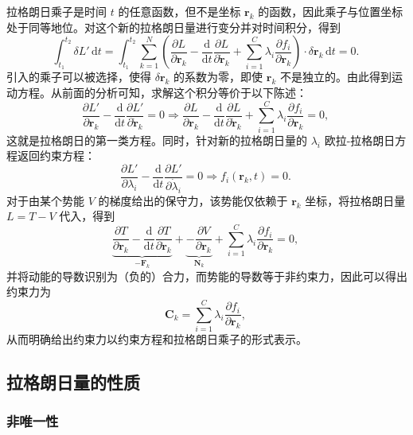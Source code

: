 拉格朗日乘子是时间 \( t \) 的任意函数，但不是坐标 \( \mathbf{r}_k \) 的函数，因此乘子与位置坐标处于同等地位。对这个新的拉格朗日量进行变分并对时间积分，得到
\[
\int_{t_{1}}^{t_{2}} \delta L' \, \mathrm{d} t = \int_{t_{1}}^{t_{2}} \sum_{k=1}^{N} \left( \frac{\partial L}{\partial \mathbf{r}_{k}} - \frac{\mathrm{d}}{\mathrm{d} t} \frac{\partial L}{\partial \dot{\mathbf{r}}_{k}} + \sum_{i=1}^{C} \lambda_{i} \frac{\partial f_{i}}{\partial \mathbf{r}_{k}} \right) \cdot \delta \mathbf{r}_{k} \, \mathrm{d} t = 0.~
\]
引入的乘子可以被选择，使得 \( \delta \mathbf{r}_k \) 的系数为零，即使 \( \mathbf{r}_k \) 不是独立的。由此得到运动方程。从前面的分析可知，求解这个积分等价于以下陈述：
\[
\frac{\partial L'}{\partial \mathbf{r}_{k}} - \frac{\mathrm{d}}{\mathrm{d} t} \frac{\partial L'}{\partial \dot{\mathbf{r}}_{k}} = 0 \Rightarrow \frac{\partial L}{\partial \mathbf{r}_{k}} - \frac{\mathrm{d}}{\mathrm{d} t} \frac{\partial L}{\partial \dot{\mathbf{r}}_{k}} + \sum_{i=1}^{C} \lambda_{i} \frac{\partial f_{i}}{\partial \mathbf{r}_{k}} = 0,~
\]
这就是拉格朗日的第一类方程。同时，针对新的拉格朗日量的 \( \lambda_i \) 欧拉-拉格朗日方程返回约束方程：
\[
\frac{\partial L'}{\partial \lambda_{i}} - \frac{\mathrm{d}}{\mathrm{d} t} \frac{\partial L'}{\partial \dot{\lambda}_{i}} = 0 \Rightarrow f_{i}(\mathbf{r}_{k}, t) = 0.~
\]
对于由某个势能 \( V \) 的梯度给出的保守力，该势能仅依赖于 \( \mathbf{r}_k \) 坐标，将拉格朗日量 \( L = T - V \) 代入，得到
\[
\underbrace{{\frac {\partial T}{\partial \mathbf{r}_{k}}}-{\frac {\mathrm{d}}{\mathrm{d} t}}{\frac {\partial T}{\partial \dot{\mathbf{r}}_{k}}}}_{-\mathbf{F}_{k}} + \underbrace{-{\frac {\partial V}{\partial \mathbf{r}_{k}}}}_{\mathbf{N}_{k}} + \sum_{i=1}^{C} \lambda_{i} \frac{\partial f_{i}}{\partial \mathbf{r}_{k}} = 0,~
\]
并将动能的导数识别为（负的）合力，而势能的导数等于非约束力，因此可以得出约束力为
\[
\mathbf{C}_{k} = \sum_{i=1}^{C} \lambda_{i} \frac{\partial f_{i}}{\partial \mathbf{r}_{k}},~
\]
从而明确给出约束力以约束方程和拉格朗日乘子的形式表示。
\subsection{拉格朗日量的性质}
\subsubsection{非唯一性}

